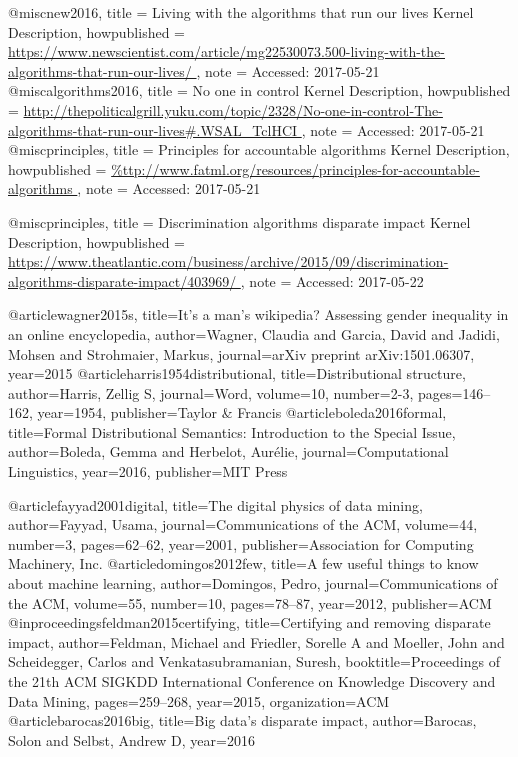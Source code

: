 
@misc{new2016,
  title = {{Living with the algorithms that run our lives} Kernel Description},
  howpublished = {\url{https://www.newscientist.com/article/mg22530073.500-living-with-the-algorithms-that-run-our-lives/
}},
  note = {Accessed: 2017-05-21}
}
@misc{algorithms2016,
  title = {{No one in control} Kernel Description},
  howpublished = {\url{http://thepoliticalgrill.yuku.com/topic/2328/No-one-in-control-The-algorithms-that-run-our-lives#.WSAL_TclHCI
}},
  note = {Accessed: 2017-05-21}
}
@misc{principles,
  title = {{Principles for accountable algorithms} Kernel Description},
  howpublished = {\url{%
}},
  note = {Accessed: 2017-05-21}
}

@misc{principles,
  title = {{Discrimination algorithms disparate impact} Kernel Description},
  howpublished = {\url{https://www.theatlantic.com/business/archive/2015/09/discrimination-algorithms-disparate-impact/403969/
}},
  note = {Accessed: 2017-05-22}
}

@article{wagner2015s,
  title={It's a man's wikipedia? Assessing gender inequality in an online encyclopedia},
  author={Wagner, Claudia and Garcia, David and Jadidi, Mohsen and Strohmaier, Markus},
  journal={arXiv preprint arXiv:1501.06307},
  year={2015}
}
@article{harris1954distributional,
  title={Distributional structure},
  author={Harris, Zellig S},
  journal={Word},
  volume={10},
  number={2-3},
  pages={146--162},
  year={1954},
  publisher={Taylor \& Francis}
}
@article{boleda2016formal,
  title={Formal Distributional Semantics: Introduction to the Special Issue},
  author={Boleda, Gemma and Herbelot, Aur{\'e}lie},
  journal={Computational Linguistics},
  year={2016},
  publisher={MIT Press}
}


@article{fayyad2001digital,
  title={The digital physics of data mining},
  author={Fayyad, Usama},
  journal={Communications of the ACM},
  volume={44},
  number={3},
  pages={62--62},
  year={2001},
  publisher={Association for Computing Machinery, Inc.}
}
@article{domingos2012few,
  title={A few useful things to know about machine learning},
  author={Domingos, Pedro},
  journal={Communications of the ACM},
  volume={55},
  number={10},
  pages={78--87},
  year={2012},
  publisher={ACM}
}
@inproceedings{feldman2015certifying,
  title={Certifying and removing disparate impact},
  author={Feldman, Michael and Friedler, Sorelle A and Moeller, John and Scheidegger, Carlos and Venkatasubramanian, Suresh},
  booktitle={Proceedings of the 21th ACM SIGKDD International Conference on Knowledge Discovery and Data Mining},
  pages={259--268},
  year={2015},
  organization={ACM}
}
@article{barocas2016big,
  title={Big data's disparate impact},
  author={Barocas, Solon and Selbst, Andrew D},
  year={2016}
}







